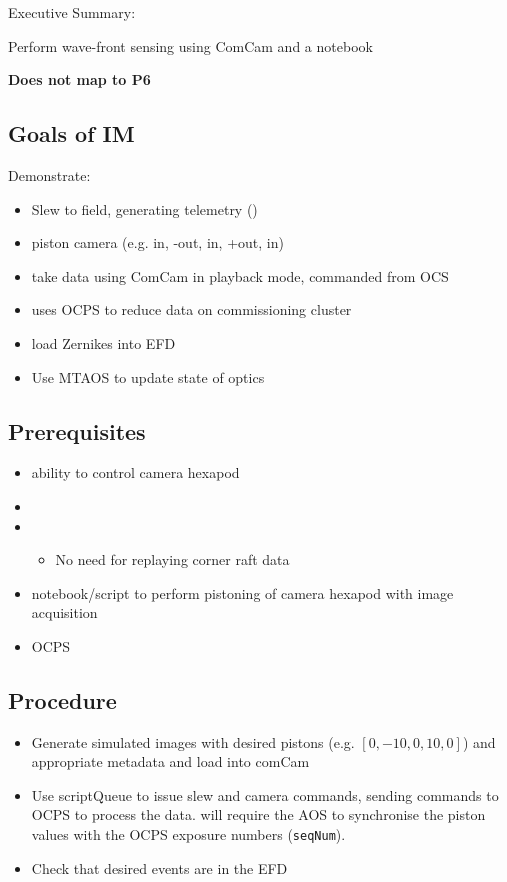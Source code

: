 
Executive Summary:

Perform wave-front sensing using ComCam and a notebook

\textbf{Does not map to P6}

\subsection{Goals of IM}
Demonstrate:
\begin{itemize}
\item Slew to field, generating telemetry (\cf {})
\item piston camera (e.g. in, -out, in, +out, in)
\item take data using ComCam in playback mode, commanded from OCS
\item uses \gls{OCPS} to reduce data on commissioning cluster
\item load Zernikes into \gls{EFD}
\item Use MTAOS to update state of optics
\end{itemize}

\subsection{Prerequisites}
\begin{itemize}
\item ability to control camera hexapod
\item {}
\item {}
  \begin{itemize}
  \item No need for replaying corner raft data
  \end{itemize}
\item notebook/script to perform pistoning of camera hexapod with image acquisition
\item \gls{OCPS}
\end{itemize}

\subsection{Procedure}
\begin{itemize}
\item Generate simulated images with desired pistons (e.g. $[0, -10, 0, 10, 0]$) and appropriate
  metadata and load into comCam
\item Use \gls{scriptQueue} to issue slew and camera commands, sending commands to \gls{OCPS}
      to process the data.  \Nb will require the \gls{AOS} to synchronise the piston values
      with the OCPS exposure numbers (\texttt{seqNum}).
\item Check that desired events are in the EFD
\end{itemize}
